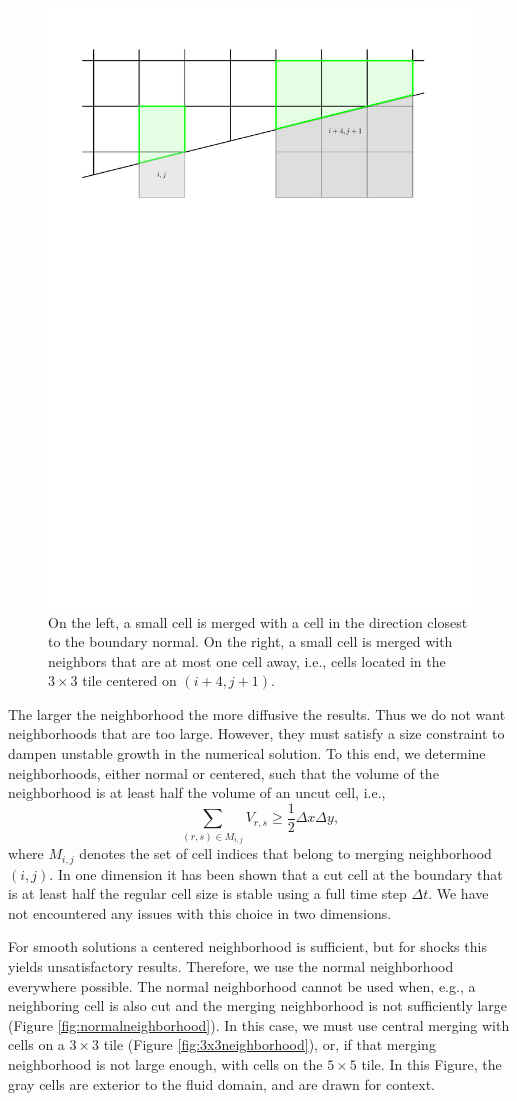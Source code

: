 \begin{figure}[h]
    \centering
    \includegraphics[width=0.5\linewidth]{figs/neighborhoods.pdf}
    \caption{\sf On the left, a small cell is merged with a cell in the direction closest to the 
    	boundary normal.  On the right, a small cell is merged with neighbors that are at most one cell away, i.e., cells located in the $3\times3$ tile centered on $(i+4,j+1)$.}
    \label{fig:neighborhoods}
\end{figure}

The larger the neighborhood the more diffusive the results. Thus we do not want neighborhoods that 
are too large.  However, they must satisfy a size constraint to dampen unstable growth in the numerical 
solution. To this end, we determine neighborhoods, either normal or centered, such that the
volume of the neighborhood is at least half the volume  of an uncut cell, i.e., 
\begin{equation} \label{eqn:vmerge}
\sum_{(r,s) \in M_{i,j}} V_{r,s} \geq \frac{1}{2}\Delta x \Delta y,
\end{equation}
where $M_{i,j}$ denotes the set of cell indices that belong to 
merging neighborhood $(i,j)$.    
In one dimension it has been shown \cite{mjb:stability2} that a cut cell at the boundary 
that is at least half the regular cell size  is stable using a full time step $\Delta t$.  
We have not encountered any issues with this choice in two dimensions.

For smooth solutions a centered neighborhood is sufficient, but for shocks this yields unsatisfactory results. Therefore, we use the normal neighborhood everywhere possible.
The normal neighborhood cannot be used when, e.g., a neighboring cell is also cut and the
merging neighborhood is not sufficiently large (Figure \ref{fig:normalneighborhood}).  In this case, we must use central merging with cells on a $3\times3$ tile (Figure \ref{fig:3x3neighborhood}), or, if that merging neighborhood is not large enough, with cells on the $5 \times 5$ tile.
In this Figure, the gray cells are exterior to the fluid domain, and
are drawn for context.



